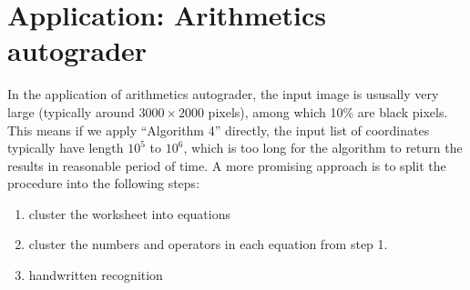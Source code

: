 
\section{Application: Arithmetics autograder}
In the application of arithmetics autograder, the input image is ususally very large (typically around \(3000\times2000\) pixels), among which 10\% are black pixels.
This means if we apply ``Algorithm 4'' directly, the input list of coordinates typically have length \(10^5\) to \(10^6\), which is too long for the algorithm to return the results in reasonable period of time.
A more promising approach is to split the procedure into the following steps:
\begin{enumerate}
    \vspace{-1.0em}
    \item cluster the worksheet into equations
    \vspace{-1.0em}
    \item cluster the numbers and operators in each equation from step 1.
    \vspace{-1.0em}
    \item handwritten recognition
\end{enumerate}

